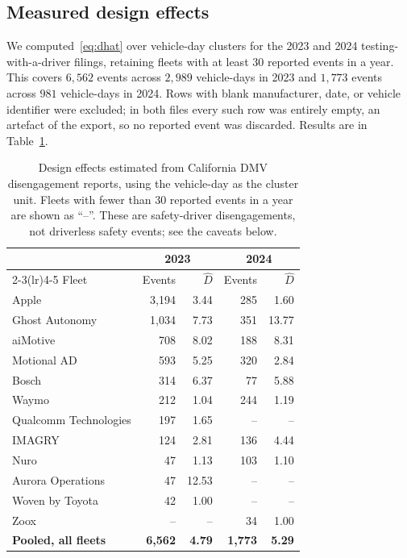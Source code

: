 \documentclass[11pt]{article}
\begin{document}
\subsection{Measured design effects}

We computed~\eqref{eq:dhat} over vehicle-day clusters for the 2023 and 2024
testing-with-a-driver filings, retaining fleets with at least $30$ reported
events in a year. This covers $6{,}562$ events across $2{,}989$ vehicle-days in
2023 and $1{,}773$ events across $981$ vehicle-days in 2024. Rows with blank
manufacturer, date, or vehicle identifier were excluded; in both files every
such row was entirely empty, an artefact of the export, so no reported event was
discarded. Results are in Table~\ref{tab:empirical}.

\begin{table}[htbp]
\centering
\caption{Design effects estimated from California DMV disengagement reports,
using the vehicle-day as the cluster unit. Fleets with fewer than $30$ reported
events in a year are shown as ``--''. These are safety-driver disengagements,
not driverless safety events; see the caveats below.}
\label{tab:empirical}
\begin{tabular}{lrrrr}
\toprule
& \multicolumn{2}{c}{2023} & \multicolumn{2}{c}{2024} \\
\cmidrule(lr){2-3}\cmidrule(lr){4-5}
Fleet & Events & $\hat{D}$ & Events & $\hat{D}$ \\
\midrule
Apple & 3,194 & 3.44 & 285 & 1.60 \\
Ghost Autonomy & 1,034 & 7.73 & 351 & 13.77 \\
aiMotive & 708 & 8.02 & 188 & 8.31 \\
Motional AD & 593 & 5.25 & 320 & 2.84 \\
Bosch & 314 & 6.37 & 77 & 5.88 \\
Waymo & 212 & 1.04 & 244 & 1.19 \\
Qualcomm Technologies & 197 & 1.65 & -- & -- \\
IMAGRY & 124 & 2.81 & 136 & 4.44 \\
Nuro & 47 & 1.13 & 103 & 1.10 \\
Aurora Operations & 47 & 12.53 & -- & -- \\
Woven by Toyota & 42 & 1.00 & -- & -- \\
Zoox & -- & -- & 34 & 1.00 \\
\midrule
\textbf{Pooled, all fleets} & \textbf{6,562} & \textbf{4.79} &
\textbf{1,773} & \textbf{5.29} \\
\bottomrule
\end{tabular}
\end{table}
\end{document}
